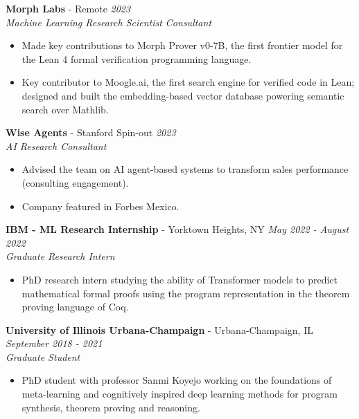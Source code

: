 \documentclass{article}
\newenvironment{changemargin}[2]{%
  \begin{list}{}{%
    \setlength{\topsep}{0pt}%
    \setlength{\leftmargin}{#1}%
    \setlength{\rightmargin}{#2}%
    \setlength{\listparindent}{\parindent}%
    \setlength{\itemindent}{\parindent}%
    \setlength{\parsep}{\parskip}%
  }%
  \item[]}{\end{list}
}
\newenvironment{body} {
	\vspace*{-16pt}
	\begin{changemargin}{-0.25in}{-0.5in}
  }	
	{\end{changemargin}
}
\begin{document}
\begin{body}
	\textbf{Morph Labs} - Remote \hfill \emph{2023}\\
	\emph{Machine Learning Research Scientist Consultant}\\
	\vspace*{-3pt}
	\begin{itemize} \itemsep -2pt
		\item Made key contributions to Morph Prover v0-7B, the first frontier model for the Lean 4 formal verification programming language.
		\item Key contributor to Moogle.ai, the first search engine for verified code in Lean; designed and built the embedding-based vector database powering semantic search over Mathlib.
	\end{itemize}
	\vspace{5 pt}

	\textbf{Wise Agents} - Stanford Spin-out \hfill \emph{2023}\\
	\emph{AI Research Consultant}\\
	\vspace*{-3pt}
	\begin{itemize} \itemsep -2pt
		\item Advised the team on AI agent-based systems to transform sales performance (consulting engagement).
		\item Company featured in Forbes Mexico.
	\end{itemize}
	\vspace{5 pt}

	\textbf{IBM - ML Research Internship} - Yorktown Heights, NY \hfill \emph{May 2022 - August 2022}\\
	\emph{Graduate Research Intern}\\
	\vspace*{-3pt}
	\begin{itemize} \itemsep -2pt  %
		\item PhD research intern studying the ability of Transformer models to predict mathematical formal proofs using the program representation in the theorem proving language of Coq.
	\end{itemize}

	\textbf{University of Illinois Urbana-Champaign} - Urbana-Champaign, IL \hfill \emph{September 2018 - 2021}\\
	\emph{Graduate Student}\\
	\vspace*{-3pt}
	\begin{itemize} \itemsep -2pt  %
		\item PhD student with professor Sanmi Koyejo working on the foundations of meta-learning and cognitively inspired deep learning methods for program synthesis, theorem proving and reasoning.
	\end{itemize}
	\vspace{5 pt}
	

\end{body}
\end{document}
